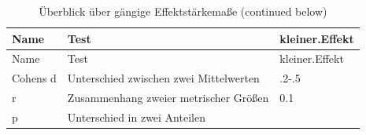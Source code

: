 \documentclass[12pt,ngerman,]{book}
\theoremstyle{definition}
\theoremstyle{definition}
\theoremstyle{remark}
\begin{document}
\begin{longtable}[]{@{}lll@{}}
\caption{Überblick über gängige Effektstärkemaße (continued
below)}\tabularnewline
\toprule
\begin{minipage}[b]{0.23\columnwidth}\raggedright\strut
Name\strut
\end{minipage} & \begin{minipage}[b]{0.42\columnwidth}\raggedright\strut
Test\strut
\end{minipage} & \begin{minipage}[b]{0.20\columnwidth}\raggedright\strut
kleiner.Effekt\strut
\end{minipage}\tabularnewline
\midrule
\endfirsthead
\toprule
\begin{minipage}[b]{0.23\columnwidth}\raggedright\strut
Name\strut
\end{minipage} & \begin{minipage}[b]{0.42\columnwidth}\raggedright\strut
Test\strut
\end{minipage} & \begin{minipage}[b]{0.20\columnwidth}\raggedright\strut
kleiner.Effekt\strut
\end{minipage}\tabularnewline
\midrule
\endhead
\begin{minipage}[t]{0.23\columnwidth}\raggedright\strut
Cohens d\strut
\end{minipage} & \begin{minipage}[t]{0.42\columnwidth}\raggedright\strut
Unterschied zwischen zwei Mittelwerten\strut
\end{minipage} & \begin{minipage}[t]{0.20\columnwidth}\raggedright\strut
.2-.5\strut
\end{minipage}\tabularnewline
\begin{minipage}[t]{0.23\columnwidth}\raggedright\strut
r\strut
\end{minipage} & \begin{minipage}[t]{0.42\columnwidth}\raggedright\strut
Zusammenhang zweier metrischer Größen\strut
\end{minipage} & \begin{minipage}[t]{0.20\columnwidth}\raggedright\strut
0.1\strut
\end{minipage}\tabularnewline
\begin{minipage}[t]{0.23\columnwidth}\raggedright\strut
p\strut
\end{minipage} & \begin{minipage}[t]{0.42\columnwidth}\raggedright\strut
Unterschied in zwei Anteilen\strut

\end{minipage}
\end{longtable}
\end{document}
